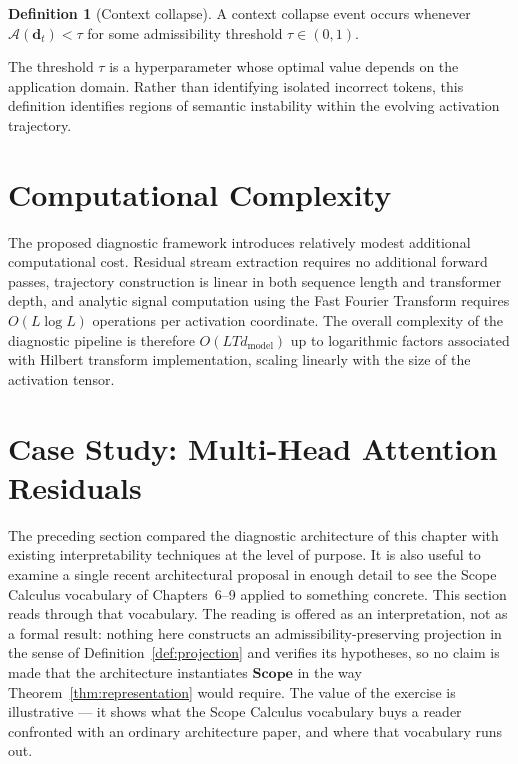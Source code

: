 \documentclass[11pt,twoside,openright]{book}
\numberwithin{equation}{chapter}
\theoremstyle{definition}
\newtheorem{definition}{Definition}[chapter]
\theoremstyle{plain}
\theoremstyle{remark}
\theoremstyle{definition}
\newcommand{\CatScope}{\mathbf{Scope}}
\begin{document}
\begin{definition}[Context collapse]
A context collapse event occurs whenever $\mathcal{A}(\mathbf{d}_t)<\tau$
for some admissibility threshold $\tau\in(0,1)$.
\end{definition}

The threshold $\tau$ is a hyperparameter whose optimal value depends on
the application domain. Rather than identifying isolated incorrect
tokens, this definition identifies regions of semantic instability within
the evolving activation trajectory.

\section{Computational Complexity}

The proposed diagnostic framework introduces relatively modest additional
computational cost. Residual stream extraction requires no additional
forward passes, trajectory construction is linear in both sequence length
and transformer depth, and analytic signal computation using the Fast
Fourier Transform requires $O(L\log L)$ operations per activation
coordinate. The overall complexity of the diagnostic pipeline is
therefore $O(LTd_{\mathrm{model}})$ up to logarithmic factors associated
with Hilbert transform implementation, scaling linearly with the size of
the activation tensor.

\section{Case Study: Multi-Head Attention Residuals}
\label{sec:mhar-case-study}

The preceding section compared the diagnostic architecture of this
chapter with existing interpretability techniques at the level of
purpose. It is also useful to examine a single recent architectural
proposal in enough detail to see the Scope Calculus vocabulary of
Chapters~6--9 applied to something concrete. This section reads
\citet{Luo2026} through that vocabulary. The reading is offered as an
interpretation, not as a formal result: nothing here constructs an
admissibility-preserving projection in the sense of
Definition~\ref{def:projection} and verifies its hypotheses, so no claim
is made that the architecture instantiates $\CatScope$ in the way
Theorem~\ref{thm:representation} would require. The value of the
exercise is illustrative --- it shows what the Scope Calculus vocabulary
buys a reader confronted with an ordinary architecture paper, and where
that vocabulary runs out.
\end{document}
